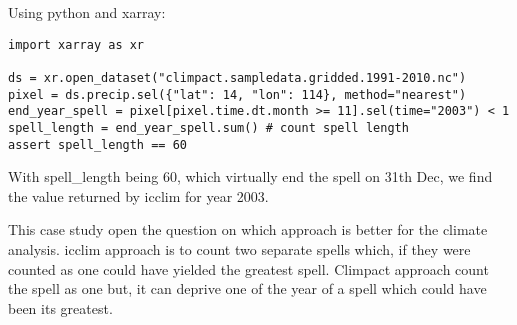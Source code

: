 \documentclass[a4paper,11pt]{article}
\begin{document}
            Using python and xarray:
            
            \begin{minipage}{\linewidth}
            \begin{lstlisting}
import xarray as xr

ds = xr.open_dataset("climpact.sampledata.gridded.1991-2010.nc")
pixel = ds.precip.sel({"lat": 14, "lon": 114}, method="nearest")
end_year_spell = pixel[pixel.time.dt.month >= 11].sel(time="2003") < 1
spell_length = end_year_spell.sum() # count spell length
assert spell_length == 60
            \end{lstlisting}
            \end{minipage}

            With spell\_length being 60, which virtually end the spell on 31th Dec, we find the value returned by icclim for year 2003.

            This case study open the question on which approach is better for the climate analysis.
            icclim approach is to count two separate spells which, if they were counted as one could have yielded the greatest spell.
            Climpact approach count the spell as one but, it can deprive one of the year of a spell which could have been its greatest.
\end{document}
